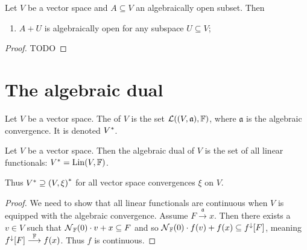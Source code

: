 \begin{proposition} \label{algebraicallyOpen}
Let $V$ be a vector space and $A \subseteq V$ an algebraically open subset. Then
\begin{enumerate}
\item $A+U$ is algebraically open for any subspace $U\subseteq V$;
\end{enumerate}
\end{proposition}
\begin{proof}
TODO
\end{proof}

\section{The algebraic dual}
\begin{definition}
Let $V$ be a vector space. The  of $V$ is the set $\contLin(\sSet{V,\mathfrak{a}}, \F)$, where $\mathfrak{a}$ is the algebraic convergence. It is denoted ${V}^*$.
\end{definition}

\begin{proposition} \label{algebraicDual}
Let $V$ be a vector space. Then the algebraic dual of $V$ is the set of all linear functionals: $V^* = \operatorname{Lin}(V,\mathbb{F})$.

Thus $V^* \supseteq \sSet{V,\xi}^*$ for all vector space convergences $\xi$ on $V$.
\end{proposition}
\begin{proof}
We need to show that all linear functionals are continuous when $V$ is equipped with the algebraic convergence. Assume $F\overset{\mathfrak{a}}{\longrightarrow} x$. Then there exists a $v\in V$ such that $\operatorname{\mathcal{N}}_{\mathbb{F}}(0)\cdot v+x \subseteq F$ and so $\operatorname{\mathcal{N}}_{\mathbb{F}}(0)\cdot f(v)+f(x) \subseteq f^\downarrow[F]$, meaning $f^\downarrow[F] \overset{\mathbb{F}}{\longrightarrow} f(x)$. Thus $f$ is continuous.
\end{proof}


